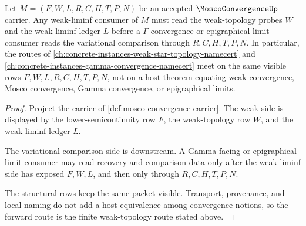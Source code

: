 \begin{theorem}
\label{thm:mosco-convergence-weak-topology-forward-route}
Let $M=(F,W,L,R,C,H,T,P,N)$ be an accepted $\MoscoConvergenceUp$ carrier. Any weak-liminf consumer of $M$ must read the weak-topology probes $W$ and the weak-liminf ledger $L$ before a $\Gamma$-convergence or epigraphical-limit consumer reads the variational comparison through $R,C,H,T,P,N$. In particular, the routes of \autoref{ch:concrete-instances-weak-star-topology-namecert} and \autoref{ch:concrete-instances-gamma-convergence-namecert} meet on the same visible rows $F,W,L,R,C,H,T,P,N$, not on a host theorem equating weak convergence, Mosco convergence, Gamma convergence, or epigraphical limits.
\end{theorem}
\begin{proof}
Project the carrier of \autoref{def:mosco-convergence-carrier}. The weak side is displayed by the lower-semicontinuity row $F$, the weak-topology row $W$, and the weak-liminf ledger $L$.

The variational comparison side is downstream. A Gamma-facing or epigraphical-limit consumer may read recovery and comparison data only after the weak-liminf side has exposed $F,W,L$, and then only through $R,C,H,T,P,N$.

The structural rows keep the same packet visible. Transport, provenance, and local naming do not add a host equivalence among convergence notions, so the forward route is the finite weak-topology route stated above.
\end{proof}
